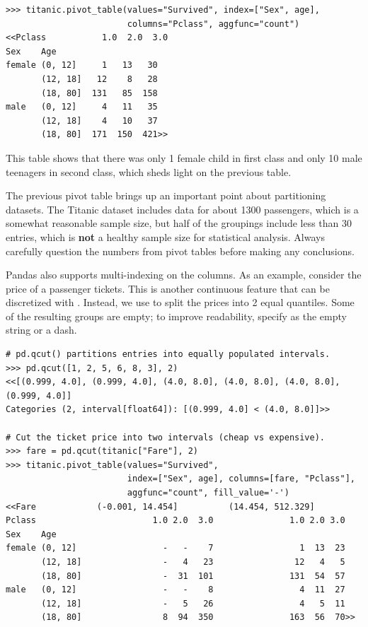 \begin{lstlisting}
>>> titanic.pivot_table(values="Survived", index=["Sex", age],
                        columns="Pclass", aggfunc="count")
<<Pclass           1.0  2.0  3.0
Sex    Age
female (0, 12]     1   13   30
       (12, 18]   12    8   28
       (18, 80]  131   85  158
male   (0, 12]     4   11   35
       (12, 18]    4   10   37
       (18, 80]  171  150  421>>
\end{lstlisting}

This table shows that there was only 1 female child in first class and only 10 male teenagers in second class, which sheds light on the previous table.

\begin{warn}
The previous pivot table brings up an important point about partitioning datasets.
The Titanic dataset includes data for about 1300 passengers, which is a somewhat reasonable sample size, but half of the groupings include less than 30 entries, which is \textbf{not} a healthy sample size for statistical analysis.
Always carefully question the numbers from pivot tables before making any conclusions.
\end{warn}

Pandas also supports multi-indexing on the columns.
As an example, consider the price of a passenger tickets.
This is another continuous feature that can be discretized with .
Instead, we use  to split the prices into 2 equal quantiles.
Some of the resulting groups are empty; to improve readability, specify  as the empty string or a dash.

\begin{lstlisting}
# pd.qcut() partitions entries into equally populated intervals.
>>> pd.qcut([1, 2, 5, 6, 8, 3], 2)
<<[(0.999, 4.0], (0.999, 4.0], (4.0, 8.0], (4.0, 8.0], (4.0, 8.0], (0.999, 4.0]]
Categories (2, interval[float64]): [(0.999, 4.0] < (4.0, 8.0]]>>

# Cut the ticket price into two intervals (cheap vs expensive).
>>> fare = pd.qcut(titanic["Fare"], 2)
>>> titanic.pivot_table(values="Survived",
                        index=["Sex", age], columns=[fare, "Pclass"],
                        aggfunc="count", fill_value='-')
<<Fare            (-0.001, 14.454]          (14.454, 512.329]
Pclass                       1.0 2.0  3.0               1.0 2.0 3.0
Sex    Age
female (0, 12]                 -   -    7                 1  13  23
       (12, 18]                -   4   23                12   4   5
       (18, 80]                -  31  101               131  54  57
male   (0, 12]                 -   -    8                 4  11  27
       (12, 18]                -   5   26                 4   5  11
       (18, 80]                8  94  350               163  56  70>>
\end{lstlisting}

